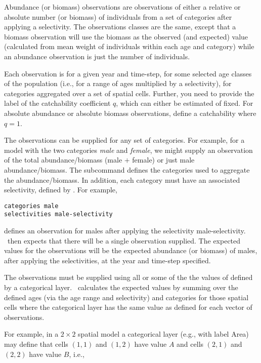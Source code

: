 {{{{{{Abundance (or biomass) observations are observations of either a relative or absolute number (or biomass) of individuals from a set of categories after applying a selectivity. The observations classes are the same, except that a biomass observation will use the biomass as the observed (and expected) value (calculated from mean weight of individuals within each age and category) while an abundance observation is just the number of individuals. 

Each observation is for a given year and time-step, for some selected age classes of the population (i.e., for a range of ages multiplied by a selectivity), for categories aggregated over a set of spatial cells. Further, you need to provide the label of the catchability coefficient $q$, which can either be estimated of fixed. For absolute abundance or absolute biomass observations, define a catchability where $q=1$.

The observations can be supplied for any set of categories. For example, for a model with the two categories \emph{male} and \emph{female}, we might supply an observation of the total abundance/biomass (male $+$ female) or just male abundance/biomass. The subcommand  defines the categories used to aggregate the abundance/biomass. In addition, each category must have an associated selectivity, defined by . For example,  

{\small{\begin{verbatim}
categories male
selectivities male-selectivity
\end{verbatim}}}

defines an observation for males after applying the selectivity male-selectivity. \iSAM\ then expects that there will be a single observation supplied. The expected values for the observations will be the expected abundance (or biomass) of males, after applying the selectivities, at the year and time-step specified. 

The observations must be supplied using all or some of the the values of defined by a categorical layer. \iSAM\ calculates the expected values by summing over the defined ages (via the age range and selectivity) and categories for those spatial cells where the categorical layer has the same value as defined for each vector of observations.

For example, in a $2 \times 2$ spatial model a categorical layer (e.g., with label Area) may define that cells $(1,1)$ and $(1,2)$ have value $A$ and cells $(2,1)$ and $(2,2)$ have value $B$, i.e.,

}}}}}}
